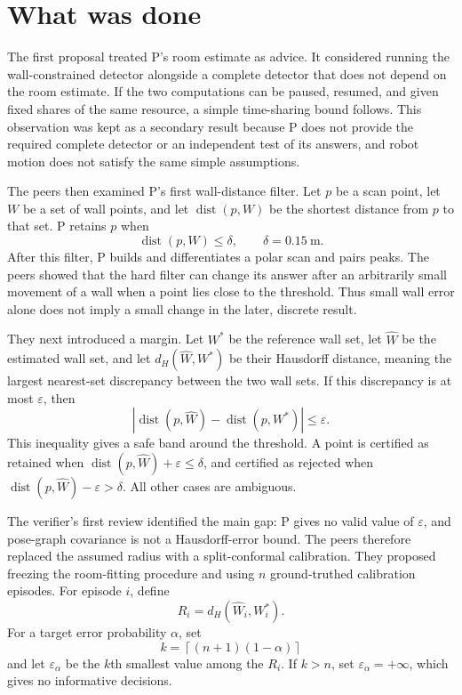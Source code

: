 \documentclass{article}
\begin{document}
\section{What was done}

The first proposal treated P's room estimate as advice. It considered running the wall-constrained detector alongside a complete detector that does not depend on the room estimate. If the two computations can be paused, resumed, and given fixed shares of the same resource, a simple time-sharing bound follows. This observation was kept as a secondary result because P does not provide the required complete detector or an independent test of its answers, and robot motion does not satisfy the same simple assumptions.

The peers then examined P's first wall-distance filter. Let $p$ be a scan point, let $W$ be a set of wall points, and let $\operatorname{dist}(p,W)$ be the shortest distance from $p$ to that set. P retains $p$ when
\begin{equation}
  \operatorname{dist}(p,W) \leq \delta,
  \qquad \delta=0.15\ \mathrm{m}.
\end{equation}
After this filter, P builds and differentiates a polar scan and pairs peaks. The peers showed that the hard filter can change its answer after an arbitrarily small movement of a wall when a point lies close to the threshold. Thus small wall error alone does not imply a small change in the later, discrete result.

They next introduced a margin. Let $W^*$ be the reference wall set, let $\widehat W$ be the estimated wall set, and let $d_H(\widehat W,W^*)$ be their Hausdorff distance, meaning the largest nearest-set discrepancy between the two wall sets. If this discrepancy is at most $\varepsilon$, then
\begin{equation}
  \left|\operatorname{dist}(p,\widehat W)
  -\operatorname{dist}(p,W^*)\right| \leq \varepsilon.
  \label{eq:distance}
\end{equation}
This inequality gives a safe band around the threshold. A point is certified as retained when
$\operatorname{dist}(p,\widehat W)+\varepsilon\leq\delta$, and certified as rejected when
$\operatorname{dist}(p,\widehat W)-\varepsilon>\delta$. All other cases are ambiguous.

The verifier's first review identified the main gap: P gives no valid value of $\varepsilon$, and pose-graph covariance is not a Hausdorff-error bound. The peers therefore replaced the assumed radius with a split-conformal calibration. They proposed freezing the room-fitting procedure and using $n$ ground-truthed calibration episodes. For episode $i$, define
\begin{equation}
  R_i=d_H(\widehat W_i,W_i^*).
\end{equation}
For a target error probability $\alpha$, set
\begin{equation}
  k=\left\lceil(n+1)(1-\alpha)\right\rceil
\end{equation}
and let $\varepsilon_\alpha$ be the $k$th smallest value among the $R_i$. If $k>n$, set $\varepsilon_\alpha=+\infty$, which gives no informative decisions.
\end{document}
